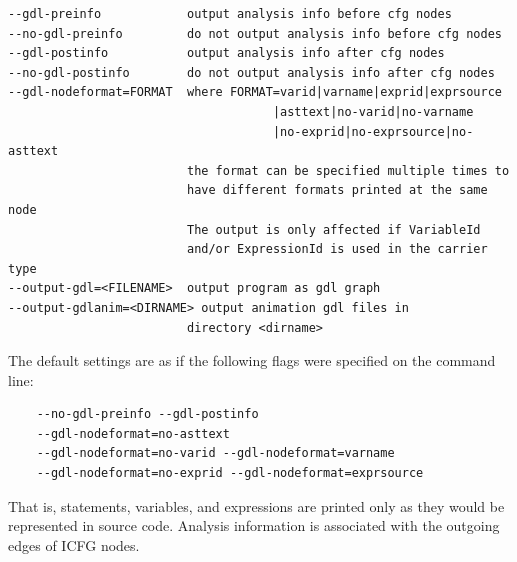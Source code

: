 \documentclass[a4paper,12pt]{report}
\begin{document}
{\footnotesize
\begin{verbatim}
--gdl-preinfo            output analysis info before cfg nodes
--no-gdl-preinfo         do not output analysis info before cfg nodes
--gdl-postinfo           output analysis info after cfg nodes
--no-gdl-postinfo        do not output analysis info after cfg nodes
--gdl-nodeformat=FORMAT  where FORMAT=varid|varname|exprid|exprsource
                                     |asttext|no-varid|no-varname
                                     |no-exprid|no-exprsource|no-asttext
                         the format can be specified multiple times to
                         have different formats printed at the same node
                         The output is only affected if VariableId
                         and/or ExpressionId is used in the carrier type
--output-gdl=<FILENAME>  output program as gdl graph
--output-gdlanim=<DIRNAME> output animation gdl files in 
                         directory <dirname>
\end{verbatim}
}

The default settings are as if the following flags were specified on the
command line:
{\footnotesize
\begin{verbatim}
    --no-gdl-preinfo --gdl-postinfo
    --gdl-nodeformat=no-asttext
    --gdl-nodeformat=no-varid --gdl-nodeformat=varname
    --gdl-nodeformat=no-exprid --gdl-nodeformat=exprsource
\end{verbatim}
}

That is, statements, variables, and expressions are printed only as they
would be represented in source code. Analysis information is associated with
the outgoing edges of ICFG nodes.



\end{document}

